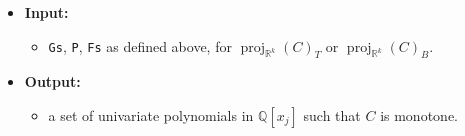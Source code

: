 \documentclass[
]{book}
\providecommand{\tightlist}{%
  \setlength{\itemsep}{0pt}\setlength{\parskip}{0pt}}
\theoremstyle{definition}
\theoremstyle{definition}
\theoremstyle{definition}
\theoremstyle{definition}
\theoremstyle{remark}
\begin{document}
\begin{itemize}
\tightlist
\item
  \textbf{Input:}

  \begin{itemize}
  \tightlist
  \item
    \texttt{Gs}, \texttt{P}, \texttt{Fs} as defined above, for \({\operatorname{proj}_{\mathbb{R}^{k}}}(C)_T\) or \({\operatorname{proj}_{\mathbb{R}^{k}}}(C)_B\).
  \end{itemize}
\item
  \textbf{Output:}

  \begin{itemize}
  \tightlist
  \item
    a set of univariate polynomials in \(\mathbb{Q}[x_j]\) such that \(C\) is monotone.
  \end{itemize}
\end{itemize}
\end{document}

